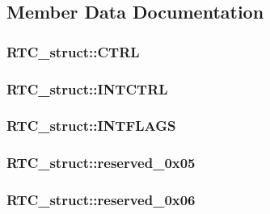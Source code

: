 \subsection{Member Data Documentation}
\hypertarget{struct_r_t_c__struct_ae1b065d3b1b8e251865aa1099e8e5de5}{
\subsubsection[{CTRL}]{ {\bf RTC\_\-struct::CTRL}}}
\label{struct_r_t_c__struct_ae1b065d3b1b8e251865aa1099e8e5de5}
\hypertarget{struct_r_t_c__struct_af0f7764a383ac790d6574dad6e73741c}{
\subsubsection[{INTCTRL}]{ {\bf RTC\_\-struct::INTCTRL}}}
\label{struct_r_t_c__struct_af0f7764a383ac790d6574dad6e73741c}
\hypertarget{struct_r_t_c__struct_a38c8904b67193d1994bfcf94a242df25}{
\subsubsection[{INTFLAGS}]{ {\bf RTC\_\-struct::INTFLAGS}}}
\label{struct_r_t_c__struct_a38c8904b67193d1994bfcf94a242df25}
\hypertarget{struct_r_t_c__struct_a91d54dab17a043d1010baec890f98bab}{
\subsubsection[{reserved\_\-0x05}]{ {\bf RTC\_\-struct::reserved\_\-0x05}}}
\label{struct_r_t_c__struct_a91d54dab17a043d1010baec890f98bab}
\hypertarget{struct_r_t_c__struct_a1def5d5fd2c1ebddc880750092f75fd6}{
\subsubsection[{reserved\_\-0x06}]{ {\bf RTC\_\-struct::reserved\_\-0x06}}}
